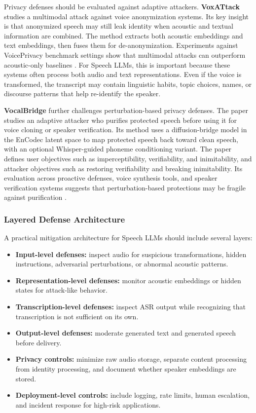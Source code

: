 Privacy defenses should be evaluated against adaptive attackers. \textbf{VoxATtack} studies a multimodal attack against voice anonymization systems. Its key insight is that anonymized speech may still leak identity when acoustic and textual information are combined. The method extracts both acoustic embeddings and text embeddings, then fuses them for de-anonymization. Experiments against VoicePrivacy benchmark settings show that multimodal attacks can outperform acoustic-only baselines \citep{aloradi2026voxattackmultimodalattackvoice}. For Speech LLMs, this is important because these systems often process both audio and text representations. Even if the voice is transformed, the transcript may contain linguistic habits, topic choices, names, or discourse patterns that help re-identify the speaker.

\textbf{VocalBridge} further challenges perturbation-based privacy defenses. The paper studies an adaptive attacker who purifies protected speech before using it for voice cloning or speaker verification. Its method uses a diffusion-bridge model in the EnCodec latent space to map protected speech back toward clean speech, with an optional Whisper-guided phoneme conditioning variant. The paper defines user objectives such as imperceptibility, verifiability, and inimitability, and attacker objectives such as restoring verifiability and breaking inimitability. Its evaluation across proactive defenses, voice synthesis tools, and speaker verification systems suggests that perturbation-based protections may be fragile against purification \citep{abbasihafshejani2026vocalbridgelatentdiffusionbridgepurification}.

\subsubsection{Layered Defense Architecture}

A practical mitigation architecture for Speech LLMs should include several layers:

\begin{itemize}
\item \textbf{Input-level defenses:} inspect audio for suspicious transformations, hidden instructions, adversarial perturbations, or abnormal acoustic patterns.
\item \textbf{Representation-level defenses:} monitor acoustic embeddings or hidden states for attack-like behavior.
\item \textbf{Transcription-level defenses:} inspect ASR output while recognizing that transcription is not sufficient on its own.
\item \textbf{Output-level defenses:} moderate generated text and generated speech before delivery.
\item \textbf{Privacy controls:} minimize raw audio storage, separate content processing from identity processing, and document whether speaker embeddings are stored.
\item \textbf{Deployment-level controls:} include logging, rate limits, human escalation, and incident response for high-risk applications.
\end{itemize}

